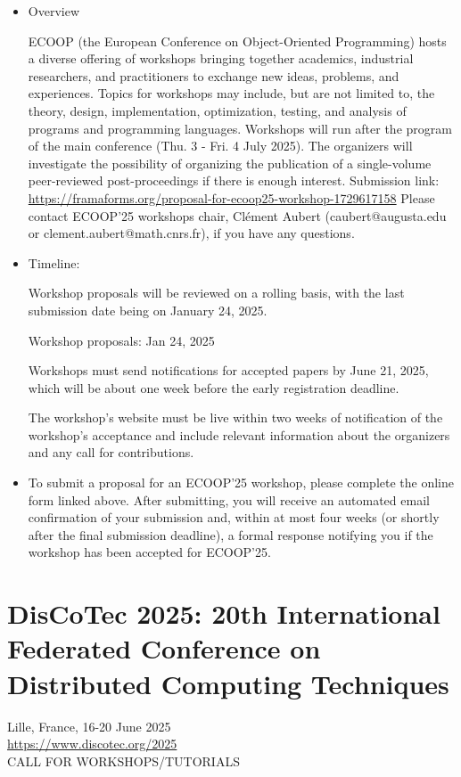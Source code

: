 \documentclass[prodmode,acmtecs]{acmsmall} %
\begin{document}
\begin{itemize}\item  Overview 
 
  ECOOP (the European Conference on Object-Oriented Programming) hosts a diverse offering of workshops bringing together academics, industrial researchers, and practitioners to exchange new ideas, problems, and experiences. Topics for workshops may include, but are not limited to, the theory, design, implementation, optimization, testing, and analysis of programs and programming languages. Workshops will run after the program of the main conference (Thu. 3 - Fri. 4 July 2025). The organizers will investigate the possibility of organizing the publication of a single-volume peer-reviewed post-proceedings if there is enough interest. Submission link: \href{https://framaforms.org/proposal-for-ecoop25-workshop-1729617158}{https://framaforms.org/proposal-for-ecoop25-workshop-1729617158} Please contact ECOOP'25 workshops chair, Clément Aubert (caubert@augusta.edu or clement.aubert@math.cnrs.fr), if you have any questions. 
 
\item  Timeline: 
 
  Workshop proposals will be reviewed on a rolling basis, with the last submission date being on January 24, 2025. 
 
Workshop proposals: Jan 24, 2025 
 
  Workshops must send notifications for accepted papers by June 21, 2025, which will be about one week before the early registration deadline. 
 
  The workshop’s website must be live within two weeks of notification of the workshop’s acceptance and include relevant information about the organizers and any call for contributions. 
 
\item  To submit a proposal for an ECOOP'25 workshop, please complete the online form linked above. After submitting, you will receive an automated email confirmation of your submission and, within at most four weeks (or shortly after the final submission deadline), a formal response notifying you if the workshop has been accepted for ECOOP'25. 
 
\end{itemize}\section{DisCoTec 2025: 20th International Federated Conference on Distributed Computing Techniques}\label{DisCoTec2025}  Lille, France, 16-20 June 2025\\ 
  \href{https://www.discotec.org/2025}{https://www.discotec.org/2025}\\ 
CALL FOR WORKSHOPS/TUTORIALS  
\end{document}
